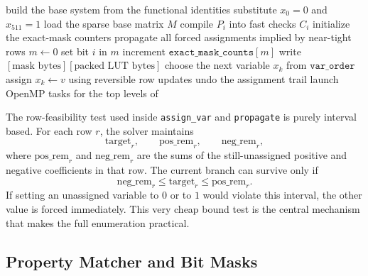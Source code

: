 \documentclass[11pt,a4paper]{article}
\begin{document}
\begin{algorithm}[t]
\caption{Enumeration and classification pipeline}
\label{alg:solver-pipeline}
\begin{algorithmic}[1]
\State build the base system from the functional identities
\State substitute \(x_0 = 0\) and \(x_{511} = 1\)
\State load the sparse base matrix \(M\)
  \State compile \(P_i\) into fast checks \(C_i\)
\EndFor
\State initialize the exact-mask counters
    \State \Return
  \EndIf
  \State propagate all forced assignments implied by near-tight rows
    \State \(m \gets 0\)
        \State set bit \(i\) in \(m\)
      \EndIf
    \EndFor
    \State increment \(\texttt{exact\_mask\_counts}[m]\)
      \State write \([\text{mask bytes}][\text{packed LUT bytes}]\)
    \EndIf
    \State \Return
  \EndIf
  \State choose the next variable \(x_k\) from \(\texttt{var\_order}\)
    \State assign \(x_k \gets v\) using reversible row updates
    \State {}
    \State undo the assignment trail
  \EndFor
\EndProcedure
\State launch OpenMP tasks for the top levels of 
\end{algorithmic}
\end{algorithm}

The row-feasibility test used inside \texttt{assign\_var} and \texttt{propagate} is purely
interval based.  For each row \(r\), the solver maintains
\[
\text{target}_r,\qquad
\text{pos\_rem}_r,\qquad
\text{neg\_rem}_r,
\]
where \(\text{pos\_rem}_r\) and \(\text{neg\_rem}_r\) are the sums of the still-unassigned
positive and negative coefficients in that row.  The current branch can survive only if
\[
\text{neg\_rem}_r \le \text{target}_r \le \text{pos\_rem}_r.
\]
If setting an unassigned variable to \(0\) or to \(1\) would violate this interval, the other
value is forced immediately.  This very cheap bound test is the central mechanism that makes the
full enumeration practical.

\subsection{Property Matcher and Bit Masks}
\end{document}
